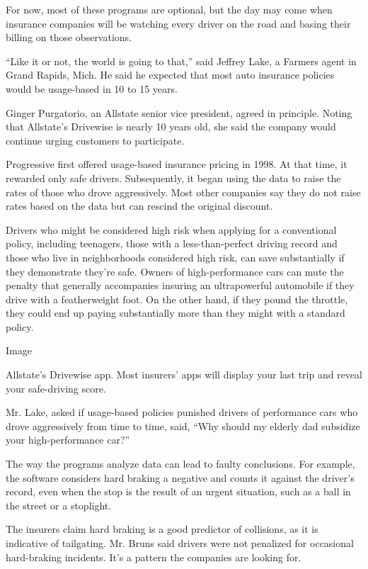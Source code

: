 For now, most of these programs are optional, but the day may come when
insurance companies will be watching every driver on the road and basing
their billing on those observations.

``Like it or not, the world is going to that,'' said Jeffrey Lake, a
Farmers agent in Grand Rapids, Mich. He said he expected that most auto
insurance policies would be usage-based in 10 to 15 years.

Ginger Purgatorio, an Allstate senior vice president, agreed in
principle. Noting that Allstate's Drivewise is nearly 10 years old, she
said the company would continue urging customers to participate.

Progressive first offered usage-based insurance pricing in 1998. At that
time, it rewarded only safe drivers. Subsequently, it began using the
data to raise the rates of those who drove aggressively. Most other
companies say they do not raise rates based on the data but can rescind
the original discount.

Drivers who might be considered high risk when applying for a
conventional policy, including teenagers, those with a less-than-perfect
driving record and those who live in neighborhoods considered high risk,
can save substantially if they demonstrate they're safe. Owners of
high-performance cars can mute the penalty that generally accompanies
insuring an ultrapowerful automobile if they drive with a featherweight
foot. On the other hand, if they pound the throttle, they could end up
paying substantially more than they might with a standard policy.

Image

Allstate's Drivewise app. Most insurers' apps will display your last
trip and reveal your safe-driving score.

Mr. Lake, asked if usage-based policies punished drivers of performance
cars who drove aggressively from time to time, said, ``Why should my
elderly dad subsidize your high-performance car?''

The way the programs analyze data can lead to faulty conclusions. For
example, the software considers hard braking a negative and counts it
against the driver's record, even when the stop is the result of an
urgent situation, such as a ball in the street or a stoplight.

The insurers claim hard braking is a good predictor of collisions, as it
is indicative of tailgating. Mr. Bruns said drivers were not penalized
for occasional hard-braking incidents. It's a pattern the companies are
looking for.

